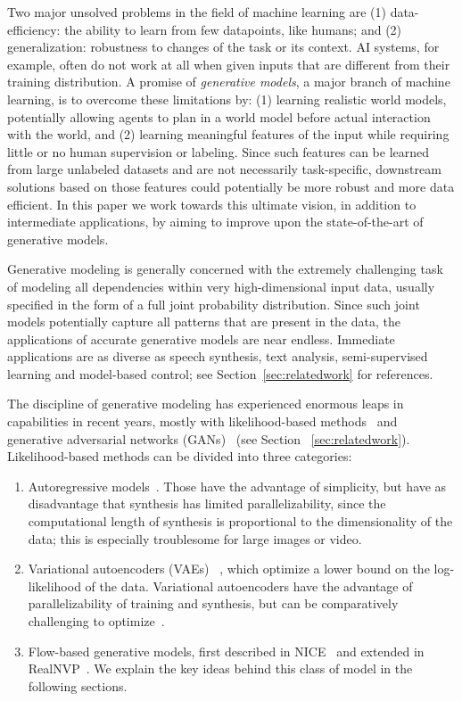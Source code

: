 \documentclass{article}
\begin{document}
Two major unsolved problems in the field of machine learning are (1) data-efficiency: the ability to learn from few datapoints, like humans; and (2) generalization: robustness to changes of the task or its context. AI systems, for example, often do not work at all when given inputs that are different from their training distribution. A promise of \emph{generative models}, a major branch of machine learning, is to overcome these limitations by:
(1) learning realistic world models, potentially allowing agents to plan in a world model before actual interaction with the world, and (2) learning meaningful features of the input while requiring little or no human supervision or labeling. Since such features can be learned from large unlabeled datasets and are not necessarily task-specific, downstream solutions based on those features could potentially be more robust and more data efficient. In this paper we work towards this ultimate vision, in addition to intermediate applications, by aiming to improve upon the state-of-the-art of generative models.

Generative modeling is generally concerned with the extremely challenging task of modeling all dependencies within very high-dimensional input data, usually specified in the form of a full joint probability distribution. Since such joint models potentially capture all patterns that are present in the data, the applications of accurate generative models are near endless. Immediate applications are as diverse as speech synthesis, text analysis, semi-supervised learning and model-based control; see Section~\ref{sec:relatedwork} for references.

The discipline of generative modeling has experienced enormous leaps in capabilities in recent years, mostly with likelihood-based methods~\citep{graves2013generating,kingma2013auto,kingma2018vaes,dinh2014nice,pixelrnn} and generative adversarial networks (GANs)~\citep{goodfellow2014generative} (see Section ~\ref{sec:relatedwork}). Likelihood-based methods can be divided into three categories:
\begin{enumerate}
\item Autoregressive models~\citep{hochreiter1997long,graves2013generating,pixelrnn,oord2016conditional,van2016wavenet}. Those have the advantage of simplicity, but have as disadvantage that synthesis has limited parallelizability, since the computational length of synthesis is proportional to the dimensionality of the data; this is especially troublesome for large images or video.
\item Variational autoencoders (VAEs) ~\citep{kingma2013auto,kingma2018vaes}, which optimize a lower bound on the log-likelihood of the data. Variational autoencoders have the advantage of parallelizability of training and synthesis, but can be comparatively challenging to optimize~\citep{kingma2016improving}.
\item Flow-based generative models, first described in NICE~\citep{dinh2014nice} and extended in RealNVP~\citep{dinh2016density}. We explain the key ideas behind this class of model in the following sections.
\end{enumerate}
\end{document}
